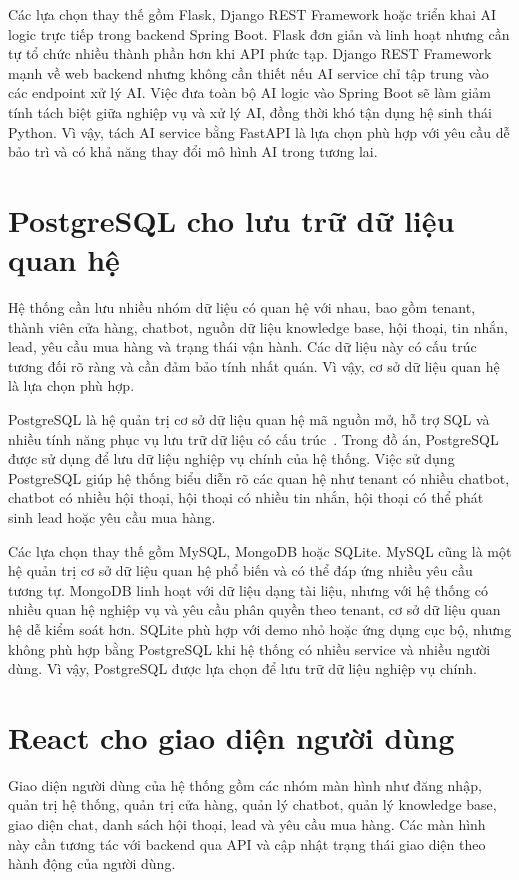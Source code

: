 \documentclass[../DoAn.tex]{subfiles}
\begin{document}
Các lựa chọn thay thế gồm Flask, Django REST Framework hoặc triển khai AI logic trực tiếp trong backend Spring Boot. Flask đơn giản và linh hoạt nhưng cần tự tổ chức nhiều thành phần hơn khi API phức tạp. Django REST Framework mạnh về web backend nhưng không cần thiết nếu AI service chỉ tập trung vào các endpoint xử lý AI. Việc đưa toàn bộ AI logic vào Spring Boot sẽ làm giảm tính tách biệt giữa nghiệp vụ và xử lý AI, đồng thời khó tận dụng hệ sinh thái Python. Vì vậy, tách AI service bằng FastAPI là lựa chọn phù hợp với yêu cầu dễ bảo trì và có khả năng thay đổi mô hình AI trong tương lai.

\section{PostgreSQL cho lưu trữ dữ liệu quan hệ}
\label{section:3.8}

Hệ thống cần lưu nhiều nhóm dữ liệu có quan hệ với nhau, bao gồm tenant, thành viên cửa hàng, chatbot, nguồn dữ liệu knowledge base, hội thoại, tin nhắn, lead, yêu cầu mua hàng và trạng thái vận hành. Các dữ liệu này có cấu trúc tương đối rõ ràng và cần đảm bảo tính nhất quán. Vì vậy, cơ sở dữ liệu quan hệ là lựa chọn phù hợp.

PostgreSQL là hệ quản trị cơ sở dữ liệu quan hệ mã nguồn mở, hỗ trợ SQL và nhiều tính năng phục vụ lưu trữ dữ liệu có cấu trúc~\cite{postgres_docs}. Trong đồ án, PostgreSQL được sử dụng để lưu dữ liệu nghiệp vụ chính của hệ thống. Việc sử dụng PostgreSQL giúp hệ thống biểu diễn rõ các quan hệ như tenant có nhiều chatbot, chatbot có nhiều hội thoại, hội thoại có nhiều tin nhắn, hội thoại có thể phát sinh lead hoặc yêu cầu mua hàng.

Các lựa chọn thay thế gồm MySQL, MongoDB hoặc SQLite. MySQL cũng là một hệ quản trị cơ sở dữ liệu quan hệ phổ biến và có thể đáp ứng nhiều yêu cầu tương tự. MongoDB linh hoạt với dữ liệu dạng tài liệu, nhưng với hệ thống có nhiều quan hệ nghiệp vụ và yêu cầu phân quyền theo tenant, cơ sở dữ liệu quan hệ dễ kiểm soát hơn. SQLite phù hợp với demo nhỏ hoặc ứng dụng cục bộ, nhưng không phù hợp bằng PostgreSQL khi hệ thống có nhiều service và nhiều người dùng. Vì vậy, PostgreSQL được lựa chọn để lưu trữ dữ liệu nghiệp vụ chính.

\section{React cho giao diện người dùng}
\label{section:3.9}

Giao diện người dùng của hệ thống gồm các nhóm màn hình như đăng nhập, quản trị hệ thống, quản trị cửa hàng, quản lý chatbot, quản lý knowledge base, giao diện chat, danh sách hội thoại, lead và yêu cầu mua hàng. Các màn hình này cần tương tác với backend qua API và cập nhật trạng thái giao diện theo hành động của người dùng.
\end{document}
